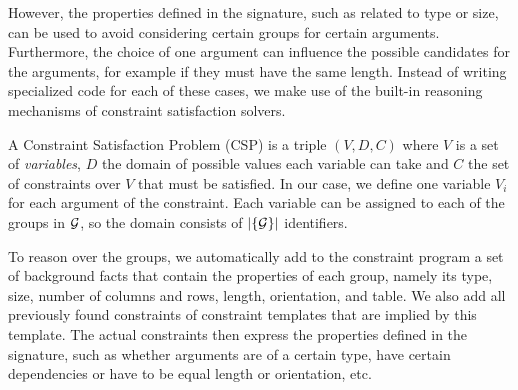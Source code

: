 \documentclass{IEEEtran}
\newcommand{\tias}[1]{\textcolor{blue}{{\sc Tias:} #1}\xspace}
\newcommand{\format}[1]{\textit{#1}\xspace}
\newcommand{\template}{\format{constraint template}}
\newcommand{\CSignature}{Signature\xspace}
\newcommand{\groups}{\ensuremath{\mathcal{G}}\xspace}
\theoremstyle{definition}
\begin{document}
However, the properties defined in the signature, such as related to type or size, can be used to avoid considering certain groups for certain arguments.
Furthermore, the choice of one argument can influence the possible candidates for the arguments, for example if they must have the same length.
Instead of writing specialized code for each of these cases, we make use of the built-in reasoning mechanisms of constraint satisfaction solvers.

A Constraint Satisfaction Problem (CSP) is a triple $(V,D,C)$ where $V$ is a set of \textit{variables}, $D$ the domain of possible values each variable can take and $C$ the set of constraints over $V$ that must be satisfied. In our case, we define one variable $V_i$ for each argument of the constraint. Each variable can be assigned to each of the groups in ${\cal G}$, so the domain consists of $|\{\cal G\}|$ identifiers.



To reason over the groups, we automatically add to the constraint program a set of background facts that contain the properties of each group, namely its type, size, number of columns and rows, length, orientation, and table. We also add all previously found constraints of constraint templates that are implied by this template. The actual constraints then express the properties defined in the signature, such as whether arguments are of a certain type, have certain dependencies or have to be equal length or orientation, etc.
\end{document}
